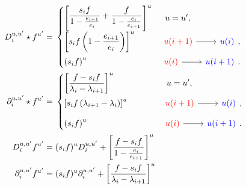 \documentclass[reqno,11pt]{book}
\numberwithin{equation}{section}
\theoremstyle{plain}
\theoremstyle{plain}
\numberwithin{equation}{section}
\theoremstyle{remark}
\begin{document}
\begin{align*}
  D_i^{u,u'} \star f^{u'}=\;&\begin{cases}
  \left[ \raisebox{1mm}{$\displaystyle\frac{s_i f}{ 1-\frac{e_{i+1}}{e_{i}}}     + \frac{f}{1-\frac{e_{i}}{e_{i+1}}}$}   \right]^{u} & \hspace{2mm}u=u',\\[3mm]
  \left[s_i f  \left(\displaystyle 1-\frac{e_{i+1}}{e_{i}}\right) \right]^{u} & \begin{tikzcd}[ampersand replacement=\&]
  	\textcolor{red}{u(i+1)} \& \textcolor{blue}{u(i)} 
  	\arrow[from=1-1, to=1-2]
   \end{tikzcd},\\[3mm]
  \left(s_i f \right)^{u} & \begin{tikzcd}[ampersand replacement=\&]
    	\textcolor{red}{u(i)} \& \textcolor{blue}{u(i+1)} 
    	\arrow[from=1-1, to=1-2]
     \end{tikzcd}.\\
  \end{cases}\\ 
  \partial_i^{u,u'} \star f^{u'}=\;&\begin{cases}
  \left[\displaystyle\frac{f - s_i f}{ \lambda_i-\lambda_{i+1}}  \right]^{u} \hspace{16mm}$\,$& \hspace{2mm}u=u',\\[3mm]
  \left[s_i f  \left(\lambda_{i+1}-\lambda_i\right) \right]^{u} & \begin{tikzcd}[ampersand replacement=\&]
  	\textcolor{red}{u(i+1)} \& \textcolor{blue}{u(i)} 
  	\arrow[from=1-1, to=1-2]
   \end{tikzcd},\\[3mm]
  \left(s_i f \right)^{u} & \begin{tikzcd}[ampersand replacement=\&]
    	\textcolor{red}{u(i)} \& \textcolor{blue}{u(i+1)} 
    	\arrow[from=1-1, to=1-2]
     \end{tikzcd}.\\
  \end{cases}\\ 
  D_i^{u,u'} f^{u'} =\;& (s_i f)^{u} D_i^{u,u'} + \left[\frac{f- s_i f}{1- \frac{e_{i}}{e_{i+1}}}\right]^{u}\\ 
  \partial_i^{u,u'} f^{u'} =\;& (s_i f)^{u} \partial_i^{u,u'} + \left[\frac{f- s_i f}{\lambda_{i}-\lambda_{i+1}}\right]^{u}\\   
\end{align*}
\endgroup
\end{document}
